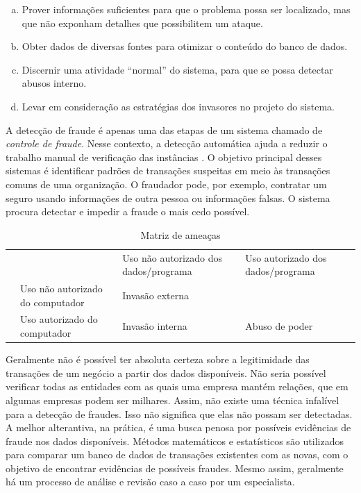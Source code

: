 \begin{enumerate}[a)]
\item Prover informações suficientes para que o problema possa ser localizado, mas que não exponham detalhes que possibilitem um ataque.
\item Obter dados de diversas fontes para otimizar o conteúdo do banco de dados.
\item Discernir uma atividade ``normal'' do sistema, para que se possa detectar abusos interno.
\item Levar em consideração as estratégias dos invasores no projeto do sistema.
\end{enumerate}

A detecção de fraude é apenas uma das etapas de um sistema chamado de \emph{controle de fraude}. Nesse contexto, a detecção automática ajuda a reduzir o trabalho manual de verificação das instâncias \cite{Phua2010}. O objetivo principal desses sistemas é identificar padrões de transações suspeitas em meio às transações comuns de uma organização. O fraudador pode, por exemplo, contratar um seguro usando informações de outra pessoa ou informações falsas. O sistema procura detectar e impedir a fraude o mais cedo possível.

\renewcommand{\arraystretch}{1.5}
\vspace{1cm}
\begin{table}[h!]
    \centering
    \begin{tabular}{c p{4cm}|>{\centering\arraybackslash}p{4cm}|>{\centering\arraybackslash}p{4cm}|}
        \cline{3-4}
        & & Uso não autorizado dos dados/programa & Uso autorizado dos dados/programa \\
        \hhline{~---}
        \multicolumn{0}{c|}{} & Uso não autorizado do computador & Invasão externa & \cellcolor{gray!90} \\
        \cline{2-4}
        \multicolumn{0}{c|}{} & Uso autorizado do computador & Invasão interna & Abuso de poder \\
        \cline{2-4}
    \end{tabular}
    \caption{Matriz de ameaças \cite{Anderson1972}}
    \label{fraud:and}
\end{table}
\vspace{1cm}

Geralmente não é possível ter absoluta certeza sobre a legitimidade das transações de um negócio a partir dos dados disponíveis. Não seria possível verificar todas as entidades com as quais uma empresa mantém relações, que em algumas empresas podem ser milhares. Assim, não existe uma técnica infalível para a detecção de fraudes. Isso não significa que elas não possam ser detectadas. A melhor alterantiva, na prática, é uma busca penosa por possíveis evidências de fraude nos dados disponíveis. Métodos matemáticos e estatísticos são utilizados para comparar um banco de dados de transações existentes com as novas, com o objetivo de encontrar evidências de possíveis fraudes. Mesmo assim, geralmente há um processo de análise e revisão caso a caso por um especialista.

